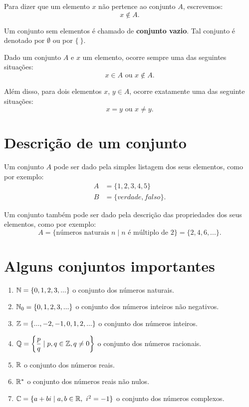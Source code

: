 Para dizer que um elemento $x$ n{\~a}o pertence ao conjunto $A$, escrevemos:
\[
    x \notin A.
\]

Um conjunto sem elementos {\'e} chamado de \textbf{conjunto vazio}. Tal conjunto {\'e} denotado por $\emptyset$ ou por $\{\ \}$.

Dado um conjunto $A$ e $x$ um elemento, ocorre sempre uma das seguintes situa\c{c}\~oes:
\[
    x \in A \mbox{ ou } x \notin A.
\]

Al{\'e}m disso, para dois elementos $x$, $y \in A$, ocorre exatamente uma das seguinte situa\c{c}\~oes:
\[
    x = y \mbox{ ou } x \neq y.
\]

\section{Descri{\c c}{\~a}o de um conjunto}

Um conjunto $A$ pode ser dado pela simples listagem dos seus elementos, como por exemplo:
\begin{align*}
    A &= \{1,2,3,4,5\}\\
    B &= \{verdade, falso\}.
\end{align*}

Um conjunto tamb{\'e}m pode ser dado pela descri{\c c}{\~a}o das propriedades dos seus elementos, como por exemplo:
\[
    A = \{\mbox{números naturais\ } n \mid n \mbox{ \'e m{\'u}ltiplo de } 2\} = \{2,4,6,...\}.
\]

\section{Alguns conjuntos importantes}
\begin{enumerate}[label={\arabic*})]
    \item $\mathbb{N} = \{0,1,2,3,...\}$ o conjunto dos n{\'u}meros naturais.
    \item $\mathbb{N}_0 = \{0,1,2,3,...\}$ o conjunto dos n{\'u}meros inteiros n{\~a}o negativos.
    \item $\mathbb{Z} = \{...,-2,-1,0,1,2,...\}$ o conjunto dos n{\'u}meros inteiros.
    \item $\mathbb{Q} = \left\{\dfrac{p}{q} \mid p,q \in \mathbb{Z}, q \neq 0 \right\}$ o conjunto dos n{\'u}meros racionais.
    \item $\mathbb{R} $ o conjunto dos n{\'u}meros reais.
    \item $\mathbb{R}^*$ o conjunto dos n{\'u}meros reais n{\~a}o nulos.
    \item $\mathbb{C} = \{a + bi \mid a,b \in \mathbb{R},\ i^2 = -1\}$ o conjunto dos n\'umeros complexos.
\end{enumerate}

